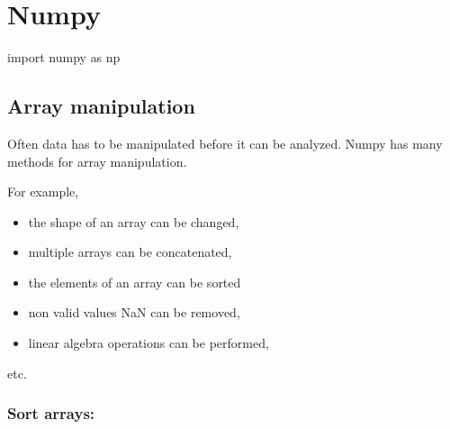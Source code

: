 \documentclass[
  letterpaper,
  DIV=11,
  numbers=noendperiod]{scrreprt}
\newenvironment{Shaded}{\begin{snugshade}}{\end{snugshade}}
\newcommand{\ImportTok}[1]{\textcolor[rgb]{0.00,0.46,0.62}{#1}}
\newcommand{\NormalTok}[1]{\textcolor[rgb]{0.00,0.23,0.31}{#1}}
\providecommand{\tightlist}{%
  \setlength{\itemsep}{0pt}\setlength{\parskip}{0pt}}\usepackage{longtable,booktabs,array}
\begin{document}

\section*{Numpy}\label{numpy-4}


\begin{Shaded}
\begin{Highlighting}[]
\ImportTok{import}\NormalTok{ numpy }\ImportTok{as}\NormalTok{ np}
\end{Highlighting}
\end{Shaded}

\subsection*{Array manipulation}\label{array-manipulation}

Often data has to be manipulated before it can be analyzed. Numpy has
many methods for array manipulation.

For example,

\begin{itemize}
\tightlist
\item
  the shape of an array can be changed,
\item
  multiple arrays can be concatenated,
\item
  the elements of an array can be sorted
\item
  non valid values NaN can be removed,
\item
  linear algebra operations can be performed,
\end{itemize}

etc.

\subsubsection*{Sort arrays:}\label{sort-arrays}
\end{document}
